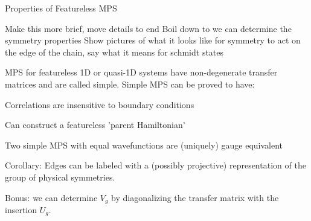 \begin{frame}{Properties of Featureless MPS}
\vskip-1.5cm

\begin{alert}{Make this more brief, move details to end}
Boil down to we can determine the symmetry properties
Show pictures of what it looks like for symmetry to act on the edge of the chain, say what it means for schmidt states
\end{alert}

MPS for featureless 1D or quasi-1D systems have non-degenerate transfer matrices and are called simple. Simple MPS can be proved to have:

\bi 
\item Correlations are insensitive to boundary conditions
\item Can construct a featureless 'parent Hamiltonian' 
\item Two simple MPS with equal wavefunctions are (uniquely) gauge equivalent
\item Corollary: Edges can be labeled with a (possibly projective) representation of the group of physical symmetries.

\begin{figure}
\scalebox{1}{
            
            }
\end{figure}

\item Bonus: we can determine $V_g$ by diagonalizing the transfer matrix with the insertion $U_g$. 

\ei 

\end{frame}